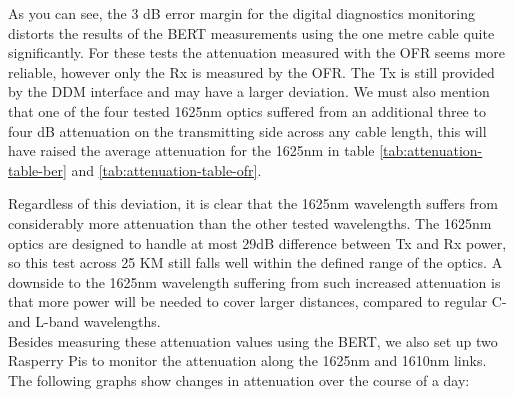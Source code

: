 \documentclass{article}
\begin{document}
As you can see, the 3 dB error margin for the digital diagnostics monitoring distorts the results of the BERT measurements using the one metre cable quite significantly.
For these tests the attenuation measured with the OFR seems more reliable, however only the Rx is measured by the OFR.
The Tx is still provided by the DDM interface and may have a larger deviation.
We must also mention that one of the four tested 1625nm optics suffered from an additional three to four dB attenuation on the transmitting side across any cable length, this will have raised the average attenuation for the 1625nm in table \ref{tab:attenuation-table-ber} and \ref{tab:attenuation-table-ofr}.

Regardless of this deviation, it is clear that the 1625nm wavelength suffers from considerably more attenuation than the other tested wavelengths.
The 1625nm optics are designed to handle at most 29dB difference between Tx and Rx power, so this test across 25 KM still falls well within the defined range of the optics.
A downside to the 1625nm wavelength suffering from such increased attenuation is that more power will be needed to cover larger distances, compared to regular C- and L-band wavelengths. \\

Besides measuring these attenuation values using the BERT, we also set up two Rasperry Pis to monitor the attenuation along the 1625nm and 1610nm links.
The following graphs show changes in attenuation over the course of a day:\\
\end{document}
